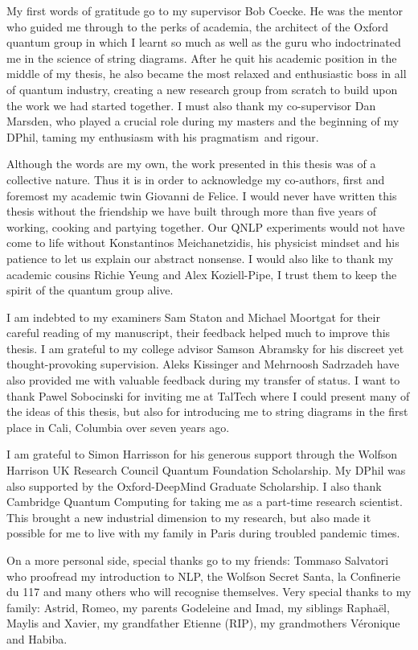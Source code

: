 
\begin{acknowledgements}

My first words of gratitude go to my supervisor Bob Coecke.
He was the mentor who guided me through to the perks of academia, the architect of the Oxford quantum group in which I learnt so much as well as the guru who indoctrinated me in the science of string diagrams.
After he quit his academic position in the middle of my thesis, he also became the most relaxed and enthusiastic boss in all of quantum industry, creating a new research group from scratch to build upon the work we had started together.
I must also thank my co-supervisor Dan Marsden, who played a crucial role during my masters and the beginning of my DPhil, taming my enthusiasm with his pragmatism and rigour.

Although the words are my own, the work presented in this thesis was of a collective nature.
Thus it is in order to acknowledge my co-authors, first and foremost my academic twin Giovanni de Felice.
I would never have written this thesis without the friendship we have built through more than five years of working, cooking and partying together.
Our QNLP experiments would not have come to life without Konstantinos Meichanetzidis, his physicist mindset and his patience to let us explain our abstract nonsense.
I would also like to thank my academic cousins Richie Yeung and Alex Koziell-Pipe, I trust them to keep the spirit of the quantum group alive.

I am indebted to my examiners Sam Staton and Michael Moortgat for their careful reading of my manuscript, their feedback helped much to improve this thesis.
I am grateful to my college advisor Samson Abramsky for his discreet yet thought-provoking supervision.
Aleks Kissinger and Mehrnoosh Sadrzadeh have also provided me with valuable feedback during my transfer of status.
I want to thank Pawel Sobocinski for inviting me at TalTech where I could present many of the ideas of this thesis, but also for introducing me to string diagrams in the first place in Cali, Columbia over seven years ago.

I am grateful to Simon Harrisson for his generous support through the Wolfson Harrison UK Research Council Quantum Foundation Scholarship.
My DPhil was also supported by the Oxford-DeepMind Graduate Scholarship.
I also thank Cambridge Quantum Computing for taking me as a part-time research scientist.
This brought a new industrial dimension to my research, but also made it possible for me to live with my family in Paris during troubled pandemic times.

On a more personal side, special thanks go to my friends: Tommaso Salvatori who proofread my introduction to NLP, the Wolfson Secret Santa, la Confinerie du 117 and many others who will recognise themselves.
Very special thanks to my family: Astrid, Romeo, my parents Godeleine and Imad, my siblings Raphaël, Maylis and Xavier, my grandfather Etienne (RIP), my grandmothers Véronique and Habiba.
\end{acknowledgements}
